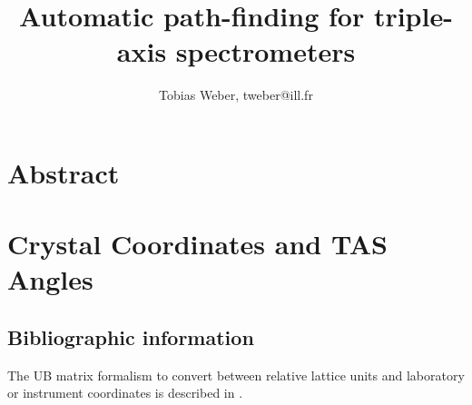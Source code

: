 \documentclass[english]{book}
\begin{document}
\newcommand{\ill}{Institut Laue-Langevin (ILL), 71 avenue des Martyrs, CS 20156, 38042 Grenoble cedex 9, France}
\newcommand{\fuh}{Fernuniversit\"at in Hagen (FUH), Universit\"atsstraße 47, 58097 Hagen, Germany}


\title{Automatic path-finding for triple-axis spectrometers}
\author{Tobias Weber, tweber@ill.fr}

\maketitle
\tableofcontents




\chapter{Abstract}


\chapter{Crystal Coordinates and TAS Angles}




\section{Bibliographic information}

The UB matrix formalism to convert between relative lattice units and laboratory or instrument coordinates is described in \cite{Lumsden2005}.





\end{document}
